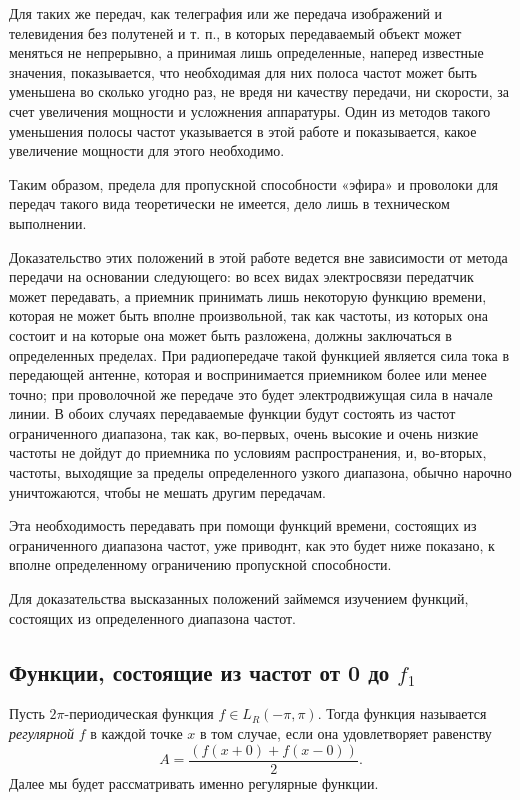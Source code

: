 Для таких же передач, как телеграфия или же передача изображений и телевидения без полутеней и т. п., в которых передаваемый объект может меняться не непрерывно, а принимая лишь определенные, наперед известные значения, показывается, что необходимая для них полоса частот может быть уменьшена во сколько угодно раз, не вредя ни качеству передачи, ни скорости, за счет увеличения мощности и усложнения аппаратуры. Один из методов такого уменьшения полосы частот указывается в этой работе и показывается, какое увеличение мощности для этого необходимо.

Таким образом, предела для пропускной способности «эфира» и проволоки для передач такого вида теоретически не имеется, дело лишь в техническом выполнении.

Доказательство этих положений в этой работе ведется вне зависимости от метода передачи на основании следующего: во всех видах электросвязи передатчик может передавать, а приемник принимать лишь некоторую функцию времени, которая не может быть вполне произвольной, так как частоты, из которых она состоит и на которые она может быть разложена, должны заключаться в определенных пределах. При радиопередаче такой функцией является сила тока в передающей антенне, которая и воспринимается приемником более или менее точно; при проволочной же передаче это будет электродвижущая сила в начале линии. В обоих случаях передаваемые функции будут состоять из частот ограниченного диапазона, так как, во-первых, очень высокие и очень низкие частоты не дойдут до приемника по условиям распространения, и, во-вторых, частоты, выходящие за пределы определенного узкого диапазона, обычно нарочно уничтожаются, чтобы не мешать другим передачам.

Эта необходимость передавать при помощи функций времени, состоящих из ограниченного диапазона частот, уже приводнт, как это будет ниже показано, к вполне определенному ограничению пропускной способности.

Для доказательства высказанных положений займемся изучением функций, состоящих из определенного диапазона частот.\newline

\subsection*{Функции, состоящие из частот от 0 до $f_1$} 

\begin{definition} Пусть $2\pi$-периодическая функция $f \in L_R(-\pi,\pi)$. Тогда функция называется \textit{регулярной} $f$ в каждой точке $x$ в том случае, если она удовлетворяет равенству $$A = \frac{(f(x+0)+f(x-0))}{2}.$$
Далее мы будет рассматривать именно регулярные функции.
\end{definition}

